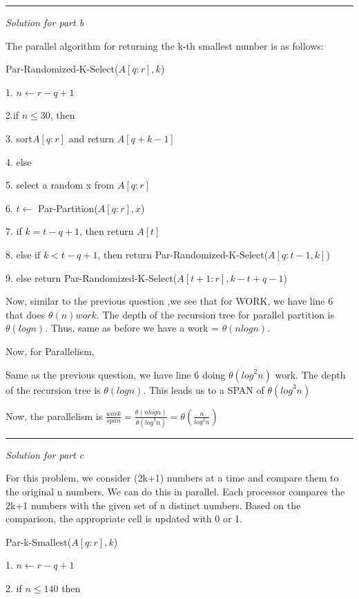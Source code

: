 \documentclass[11pt]{article}
\begin{document}
\medskip

\rule{8cm}{0.4pt}

\medskip

\textit{Solution for part b}

The parallel algorithm for returning the k-th smallest number is as follows:

Par-Randomized-K-Select($A[q:r], k$)

1. $n \leftarrow r - q+1$

2.if $n \leq 30$, then 

3. \quad sort$A[q:r]$ and return $A[q+k-1]$

4. else

5. \quad select a random x from $A[q:r]$

6. \quad $t \leftarrow $ Par-Partition($A[q:r],x$)

7. \quad if $k=t-q+1$, then return $A[t]$

8. \quad else if $k< t-q+1$, then return Par-Randomized-K-Select($A[q:t-1,k]$)

9. \quad \quad else return Par-Randomized-K-Select($A[t+1:r],k-t+q-1$)

Now, similar to the previous question ,we see that for WORK, we have line 6 that does $\theta (n) work$. The depth of the recursion tree for parallel partition is $\theta (logn)$. Thus, same as before we have a work = $\theta(n log n)$.

Now, for Parallelism,

Same as the previous question, we have line 6 doing $\theta({log}^2 n)$ work. The depth of the recursion tree is $\theta (logn)$. This leads us to a SPAN of $\theta ({log}^3 n)$

Now, the parallelism is $\frac{work}{span} = \frac{\theta(nlogn)}{\theta ({log}^3 n)} = \theta (\frac{n}{{log}^2 n})$

\medskip

\rule{8cm}{0.4pt}

\medskip

\textit{Solution for part c}

For this problem, we consider (2k+1) numbers at a time and compare them to the original n numbers. We can do this in parallel. Each processor compares the 2k+1 numbers with the given set of n distinct numbers. Based on the comparison, the appropriate cell is updated with 0 or 1.

Par-k-Smallest($A[q:r],k$)

1. $n\leftarrow r - q+1$

2. if $n\leq 140 $ then
\end{document}
